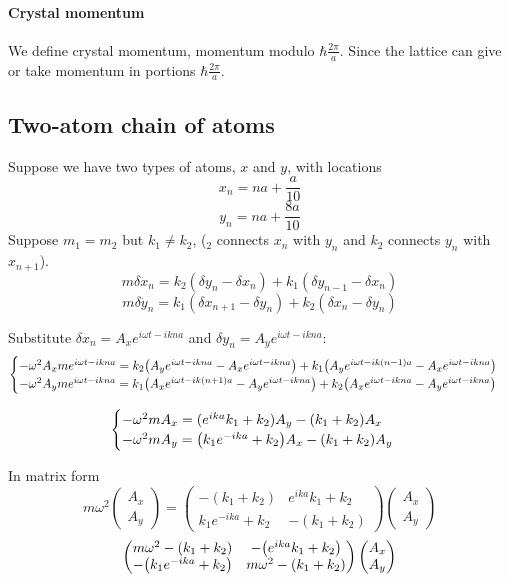 \paragraph{Crystal momentum}
We define crystal momentum, momentum modulo $\hbar\frac{2\pi}{a}$. Since the lattice can give or take momentum in portions $\hbar\frac{2\pi}{a}$.
\subsection{Two-atom chain of atoms}
Suppose we have two types of atoms, $x$ and $y$, with locations
$$x_n  = na+\frac{a}{10}$$
$$y_n  = na+\frac{8a}{10}$$
Suppose $m_1=m_2$ but $k_1\neq k_2$, ($_2$ connects $x_n$ with $y_n$ and $k_2$ connects $y_n$ with $x_{n+1}$).
$$m\delta \ddot{x}_n = k_2(\delta y_n - \delta x_n) + k_1(\delta y_{n-1} - \delta x_n)$$
$$m\delta \ddot{y}_n =k_1(\delta x_{n+1} - \delta y_{n}) + k_2(\delta x_n - \delta y_n ) $$

Substitute $\delta x_n =A_x e^{i\omega t - ikna}$ and $\delta y_n =A_y e^{i\omega t - ikna}$:
$$\begin{cases}
-\omega^2 A_x m  e^{i\omega t - ikna} = k_2\qty(A_y e^{i\omega t - ikna} - A_x e^{i\omega t - ikna}) + k_1\qty(A_y e^{i\omega t - ik(n-1)a} - A_x e^{i\omega t - ikna})\\-\omega^2 A_y m  e^{i\omega t - ikna}  =k_1\qty(A_x e^{i\omega t - ik(n+1)a} - A_y e^{i\omega t - ikna}) + k_2\qty(A_x e^{i\omega t - ikna} - A_y e^{i\omega t - ikna})
\end{cases} $$

$$\begin{cases}
-\omega^2  mA_x = (e^{ika} k_1 + k_2)A_y  - (k_1+k_2)A_x \\
-\omega^2  m A_y   =\qty(k_1 e^{ - ika} +k_2) A_x -  (k_1+k_2)A_y
\end{cases} $$

In matrix form
$$m\omega^2 \begin{pmatrix}A_x\\A_y\end{pmatrix} = \begin{pmatrix}
- (k_1+k_2)&e^{ika} k_1 + k_2\\
k_1 e^{ - ika} +k_2 & -  (k_1+k_2)
\end{pmatrix} \begin{pmatrix}A_x\\A_y\end{pmatrix} $$
$$\begin{pmatrix}
m\omega^2 - (k_1+k_2)&-\qty(e^{ika} k_1 + k_2)\\
-\qty(k_1 e^{ - ika} +k_2 )& m\omega^2 -  (k_1+k_2)
\end{pmatrix} \begin{pmatrix}A_x\\A_y\end{pmatrix} $$


